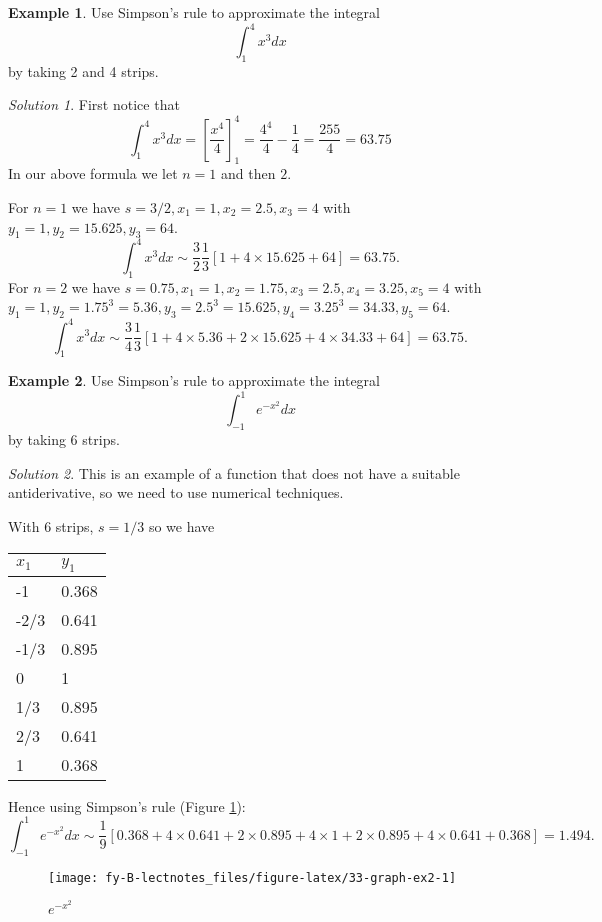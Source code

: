 \documentclass[
  11pt,
  oneside]{book}
\newcommand{\slide}{}
\theoremstyle{definition}
\theoremstyle{definition}
\newtheorem{example}{Example}[chapter]
\theoremstyle{definition}
\theoremstyle{definition}
\theoremstyle{remark}
\newtheorem*{solution}{Solution}
\begin{document}
\begin{example}
Use Simpson's rule to approximate the integral
\[
\int_1^4x^3dx
\]
by taking 2 and 4 strips.
\end{example}

\begin{solution}
First notice that
\[
\int_1^4x^3dx = \left[\frac{x^4}4\right]_1^4 = \frac{4^4}4-\frac14 = \frac{255}4=63.75
\]
In our above formula we let \(n=1\) and then \(2\).

For \(n=1\) we have \(s=3/2, x_1=1, x_2=2.5, x_3=4\) with \(y_1=1, y_2=15.625, y_3=64\).
\[
\int_1^4x^3dx\sim\frac32\frac13\left[1+4\times15.625+64\right] = 63.75.
\]
For \(n=2\) we have \(s=0.75, x_1=1, x_2=1.75, x_3=2.5, x_4=3.25, x_5=4\) with \(y_1=1, y_2=1.75^3=5.36, y_3 = 2.5^3=15.625, y_4=3.25^3=34.33, y_5=64\).
\[
\int_1^4x^3dx\sim\frac34\frac13\left[1+4\times5.36+2\times15.625+4\times34.33+64\right] = 63.75.
\]
\end{solution}

\slide

\begin{example}
Use Simpson's rule to approximate the integral
\[
\int_{-1}^1e^{-x^2}dx
\]
by taking 6 strips.
\end{example}

\begin{solution}

This is an example of a function that does not have a suitable antiderivative, so we need to use numerical techniques.

With 6 strips, \(s=1/3\) so we have

\begin{tabular}{l|l}
\hline
$x_1$ & $y_1$\\
\hline
-1 & 0.368\\
\hline
-2/3 & 0.641\\
\hline
-1/3 & 0.895\\
\hline
0 & 1\\
\hline
1/3 & 0.895\\
\hline
2/3 & 0.641\\
\hline
1 & 0.368\\
\hline
\end{tabular}

Hence using Simpson's rule (Figure \ref{fig:33-graph-ex2}):
\[
\int_{-1}^1e^{-x^2}dx \sim \frac19\left[0.368 + 4\times0.641+2\times0.895+4\times1+2\times0.895+4\times0.641+0.368\right] = 1.494.
\]

\begin{figure}

{\centering \texttt{[image: fy-B-lectnotes\_files/figure-latex/33-graph-ex2-1]} 

}

\caption{$e^{-x^2}$}\label{fig:33-graph-ex2}
\end{figure}

\end{solution}
\end{document}
